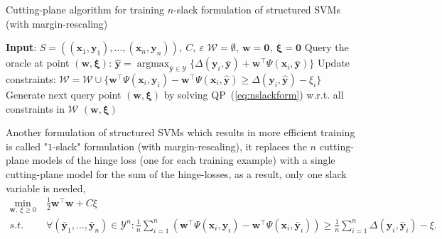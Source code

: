 \documentclass[9pt]{extarticle}
\DeclareMathOperator*{\argmax}{argmax}
\begin{document}
\begin{algorithm}[htbp]
\caption{Cutting-plane algorithm for training $n$-slack formulation of structured SVMs (with margin-rescaling)}
\label{alg:nslacktrain}
\begin{algorithmic}[1]
\STATE \textbf{Input}: $S = \left( (\mathbf{x}_1, \mathbf{y}_1), \dots, (\mathbf{x}_n, \mathbf{y}_n) \right),~ C,~ \varepsilon$
\STATE $\mathcal{W} = \emptyset,~ \mathbf{w} = \mathbf{0},~ \bm{\xi} = \mathbf{0}$
\REPEAT
        \STATE Query the oracle at point $(\mathbf{w}, \bm{\xi})$: 
               $\hat{\mathbf{y}} = \argmax_{\bar{\mathbf{y}} \in \mathcal{Y}} \{ \Delta(\mathbf{y}_i, \bar{\mathbf{y}}) + 
               \mathbf{w}^\top \Psi(\mathbf{x}_i, \bar{\mathbf{y}}) \}$
            \STATE Update constraints: $\mathcal{W} = \mathcal{W} \cup 
                   \{\mathbf{w}^\top \Psi(\mathbf{x}_i, \mathbf{y}_i) - \mathbf{w}^\top \Psi(\mathbf{x}_i, \hat{\mathbf{y}}) \ge 
                   \Delta(\mathbf{y}_i, \hat{\mathbf{y}}) - \xi_i \}$
            \STATE Generate next query point $(\mathbf{w}, \bm{\xi})$ by solving QP~(\ref{eq:nslackform}) w.r.t. all constraints in $\mathcal{W}$
        \ENDIF
    \ENDFOR
{}
\RETURN $(\mathbf{w}, \bm{\xi})$
\end{algorithmic}
\end{algorithm}


Another formulation of structured SVMs which results in more efficient training is called "$1$-slack" formulation (with margin-rescaling),
it replaces the $n$ cutting-plane models of the hinge loss (one for each training example) with a single cutting-plane model for 
the sum of the hinge-losses, as a result, only one slack variable is needed,
\begin{equation}
\label{eq:1slackform}
\begin{aligned}
\min_{\mathbf{w}, ~\xi \ge 0} ~& \frac{1}{2} \mathbf{w}^\top \mathbf{w} + C \xi \\
s.t.~~ ~& \forall(\bar{\mathbf{y}}_1, \dots, \bar{\mathbf{y}}_n) \in \mathcal{Y}^n: 
          \frac{1}{n} \sum_{i=1}^n \left( \mathbf{w}^\top \Psi(\mathbf{x}_i, \mathbf{y}_i) - \mathbf{w}^\top \Psi(\mathbf{x}_i, \bar{\mathbf{y}}_i) \right) \ge
          \frac{1}{n} \sum_{i=1}^n \Delta(\mathbf{y}_i, \bar{\mathbf{y}}_i) - \xi.
\end{aligned}
\end{equation}
\end{document}
